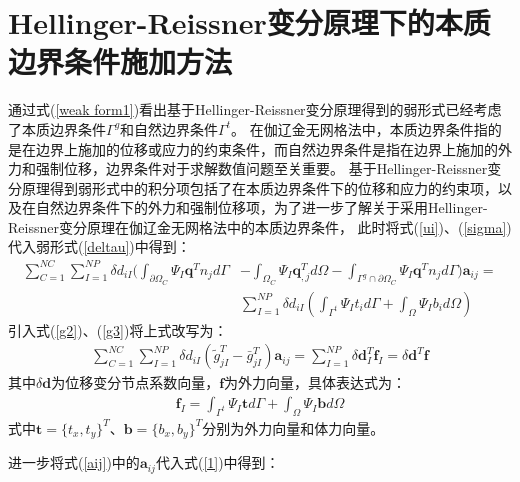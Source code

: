 \section{Hellinger-Reissner变分原理下的本质边界条件施加方法}
通过式(\ref{weak form1})看出基于Hellinger-Reissner变分原理得到的弱形式已经考虑了本质边界条件$\Gamma^g$和自然边界条件$\Gamma^t$。
在伽辽金无网格法中，本质边界条件指的是在边界上施加的位移或应力的约束条件，而自然边界条件是指在边界上施加的外力和强制位移，边界条件对于求解数值问题至关重要。
基于Hellinger-Reissner变分原理得到弱形式中的积分项包括了在本质边界条件下的位移和应力的约束项，以及在自然边界条件下的外力和强制位移项，为了进一步了解关于采用Hellinger-Reissner变分原理在伽辽金无网格法中的本质边界条件，
此时将式(\ref{ui})、(\ref{sigma})代入弱形式(\ref{deltau})中得到：
\begin{equation}
\begin{split}
\sum_{C=1}^{N\!C}\sum_{I=1}^{N\!P}\delta d_{iI}(\int_{\partial\Omega_C}\Psi_I\pmb{q}^Tn_jd\Gamma&-\int_{\Omega_C}\Psi_I\pmb{q}_{,j}^Td\Omega-\int_{\Gamma^g\cap\partial\Omega_C}\Psi_I\pmb{q}^Tn_jd\Gamma)\pmb{a}_{ij}=\\
&\sum_{I=1}^{N\!P}\delta d_{iI}(\int_{\Gamma^t}\Psi_It_id\Gamma+\int_{\Omega}\Psi_Ib_id\Omega)
\end{split}
\end{equation}
引入式(\ref{g2})、(\ref{g3})将上式改写为：
\begin{equation}\label{1}
\begin{split}
    \sum_{C=1}^{N\!C}\sum_{I=1}^{N\!P}\delta d_{iI}(\tilde{g}_{jI}^T-\bar{g}_{jI}^T)\pmb{a}_{ij}=\sum_{I=1}^{N\!P}\delta\pmb{d}_I^T\pmb{f}_I=\delta\pmb{d}^T\pmb{f}
\end{split}
\end{equation}
其中$\delta\pmb{d}$为位移变分节点系数向量，$\pmb{f}$为外力向量，具体表达式为：
\begin{equation}
\begin{split}
    \pmb{f}_I=\int_{\Gamma^t}\Psi_I\pmb{t}d\Gamma+\int_{\Omega}\Psi_I\pmb{b}d\Omega
\end{split}
\end{equation}
式中$\pmb{t}=\{t_x,t_y\}^T\text{、}\pmb{b}=\{b_x,b_y\}^T$分别为外力向量和体力向量。\par
进一步将式(\ref{aij})中的$\pmb{a}_{ij}$代入式(\ref{1})中得到：
